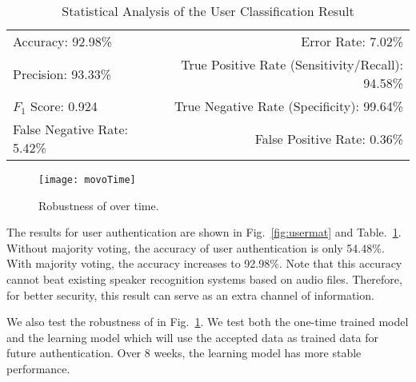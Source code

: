 \begin{table}[t]
	\caption{Statistical Analysis of the User Classification Result}
	\label{tab:userTable}
	\centering
	\begin{tabular}{lr}
		\toprule
		Accuracy: 92.98\% & \hspace{-.55in} Error Rate: 7.02\% \\
		Precision: 93.33\% & \hspace{-.55in} True Positive Rate (Sensitivity/Recall): 94.58\% \\
		$F_1$ Score: 0.924 & \hspace{-.55in} True Negative Rate (Specificity): 99.64\% \\
		False Negative Rate: 5.42\%  & \hspace{-.55in} False Positive Rate: 0.36\% \\
		\bottomrule
	\end{tabular}
\end{table}



\begin{figure}[h]
	\centering
	\texttt{[image: movoTime]}
	\caption{Robustness of {\shortname} over time.}
	\label{fig:time}
\end{figure}



The results for user authentication are shown in Fig.~\ref{fig:usermat} and Table.~\ref{tab:userTable}. Without majority voting, the accuracy of user authentication is only 54.48\%. With majority voting, the accuracy increases to 92.98\%. Note that this accuracy cannot beat existing speaker recognition systems based on audio files. Therefore, for better security, this result can serve as an extra channel of information. 

We also test the robustness of {\shortname} in Fig.~\ref{fig:time}. We test both the one-time trained model and the learning model which will use the accepted data as trained data for future authentication. Over 8 weeks, the learning model has more stable performance.






